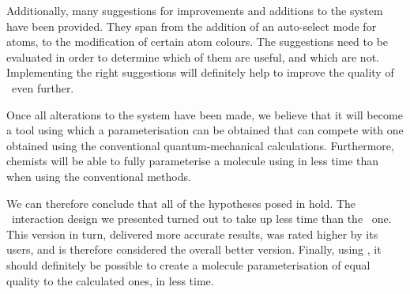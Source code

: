 Additionally, many suggestions for improvements and additions to the system have been provided. They span from the addition of an auto-select mode for atoms, to the modification of certain atom colours. The suggestions need to be evaluated in order to determine which of them are useful, and which are not. Implementing the right suggestions will definitely help to improve the quality of \oframp\ even further.

Once all alterations to the system have been made, we believe that it will become a tool using which a parameterisation can be obtained that can compete with one obtained using the conventional quantum-mechanical calculations. Furthermore, chemists will be able to fully parameterise a molecule using \oframp{} in less time than when using the conventional methods.

We can therefore conclude that all of the hypotheses posed in  hold. The \IDb\ interaction design we presented turned out to take up less time than the \IDa\ one. This version in turn, delivered more accurate results, was rated higher by its users, and is therefore considered the overall better version. Finally, using \oframp, it should definitely be possible to create a molecule parameterisation of equal quality to the calculated ones, in less time.
